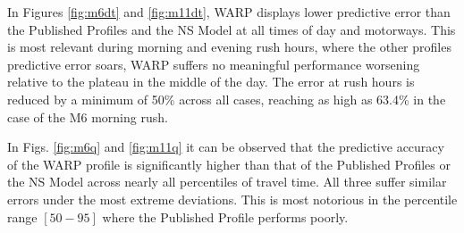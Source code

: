 \documentclass[a4paper, 10pt, conference]{ieeeconf}      %
\begin{document}
In Figures \ref{fig:m6dt} and \ref{fig:m11dt}, WARP displays lower predictive error than the Published Profiles and the NS Model at all times of day and motorways. 
This is most relevant during morning and evening rush hours, where the other profiles predictive error soars, WARP suffers no meaningful performance worsening relative to the plateau in the middle of the day.
The error at rush hours is reduced by a minimum of 50\% across all cases, reaching as high as 63.4\% in the case of the M6 morning rush.

In Figs. \ref{fig:m6q} and \ref{fig:m11q} it can be observed that the predictive accuracy of the WARP profile is significantly higher than that of the Published Profiles or the NS Model across nearly all percentiles of travel time. All three suffer similar errors under the most extreme deviations.
This is most notorious in the percentile range $[50-95]$ where the Published Profile performs poorly.
\end{document}
